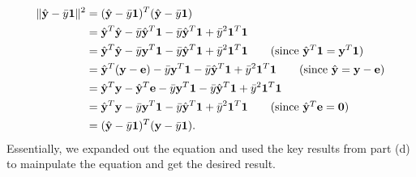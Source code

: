 \documentclass[10pt]{article}
\begin{document}
\begin{itemize}
    \begin{align*}
        \| \hat{\mathbf{y}} - \bar{y}\mathbf{1} \|^2 &= (\hat{\mathbf{y}} - \bar{y}\mathbf{1})^T(\hat{\mathbf{y}} - \bar{y}\mathbf{1}) \\
        &= \hat{\mathbf{y}}^T \hat{\mathbf{y}} - \bar{y}\hat{\mathbf{y}}^T\mathbf{1} - \bar{y}\hat{\mathbf{y}}^T\mathbf{1} + \bar{y}^2 \mathbf{1}^T\mathbf{1} \\
        &= \hat{\mathbf{y}}^T \hat{\mathbf{y}} - \bar{y}\mathbf{y}^T\mathbf{1} - \bar{y}\hat{\mathbf{y}}^T\mathbf{1} + \bar{y}^2 \mathbf{1}^T\mathbf{1} \tag{since \(\hat{\mathbf{y}}^T\mathbf{1} = \mathbf{y}^T\mathbf{1}\)}\\
        &= \hat{\mathbf{y}}^T (\mathbf{y} - \mathbf{e}) - \bar{y}\mathbf{y}^T\mathbf{1} - \bar{y}\hat{\mathbf{y}}^T\mathbf{1} + \bar{y}^2 \mathbf{1}^T\mathbf{1} \tag{since \(\hat{\mathbf{y}} = \mathbf{y} - \mathbf{e}\)}\\
        &= \hat{\mathbf{y}}^T\mathbf{y} - \hat{\mathbf{y}}^T\mathbf{e} - \bar{y}\mathbf{y}^T\mathbf{1} - \bar{y}\hat{\mathbf{y}}^T\mathbf{1} + \bar{y}^2 \mathbf{1}^T\mathbf{1} \\
        &= \hat{\mathbf{y}}^T\mathbf{y} - \bar{y}\mathbf{y}^T\mathbf{1} - \bar{y}\hat{\mathbf{y}}^T\mathbf{1} + \bar{y}^2 \mathbf{1}^T\mathbf{1} \tag{since \(\hat{\mathbf{y}}^T\mathbf{e} = \mathbf{0}\)} \\
        &= (\hat{\mathbf{y}} - \bar{y}\mathbf{1})^T(\mathbf{y} - \bar{y}\mathbf{1}).
    \end{align*}
    Essentially, we expanded out the equation and used the key results from part (d) to mainpulate the equation and get the desired result. 
\end{itemize}
\end{document}
